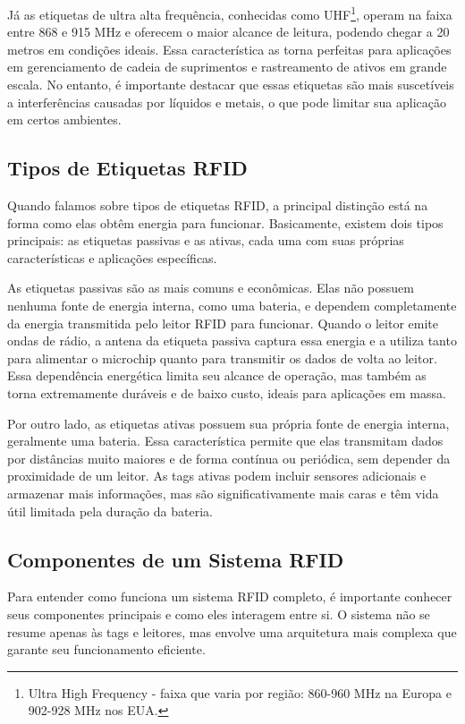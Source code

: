 Já as etiquetas de ultra alta frequência, conhecidas como UHF\footnote{Ultra High Frequency - faixa que varia por região: 860-960 MHz na Europa e 902-928 MHz nos EUA.}, operam na faixa entre 868 e 915 MHz e oferecem o maior alcance de leitura, podendo chegar a 20 metros em condições ideais. Essa característica as torna perfeitas para aplicações em gerenciamento de cadeia de suprimentos e rastreamento de ativos em grande escala. No entanto, é importante destacar que essas etiquetas são mais suscetíveis a interferências causadas por líquidos e metais, o que pode limitar sua aplicação em certos ambientes.

\subsection{Tipos de Etiquetas RFID}

Quando falamos sobre tipos de etiquetas RFID, a principal distinção está na forma como elas obtêm energia para funcionar. Basicamente, existem dois tipos principais: as etiquetas passivas e as ativas, cada uma com suas próprias características e aplicações específicas.

As etiquetas passivas são as mais comuns e econômicas. Elas não possuem nenhuma fonte de energia interna, como uma bateria, e dependem completamente da energia transmitida pelo leitor RFID para funcionar. Quando o leitor emite ondas de rádio, a antena da etiqueta passiva captura essa energia e a utiliza tanto para alimentar o microchip quanto para transmitir os dados de volta ao leitor. Essa dependência energética limita seu alcance de operação, mas também as torna extremamente duráveis e de baixo custo, ideais para aplicações em massa.

Por outro lado, as etiquetas ativas possuem sua própria fonte de energia interna, geralmente uma bateria. Essa característica permite que elas transmitam dados por distâncias muito maiores e de forma contínua ou periódica, sem depender da proximidade de um leitor. As tags ativas podem incluir sensores adicionais e armazenar mais informações, mas são significativamente mais caras e têm vida útil limitada pela duração da bateria.



\subsection{Componentes de um Sistema RFID}

Para entender como funciona um sistema RFID completo, é importante conhecer seus componentes principais e como eles interagem entre si. O sistema não se resume apenas às tags e leitores, mas envolve uma arquitetura mais complexa que garante seu funcionamento eficiente.

